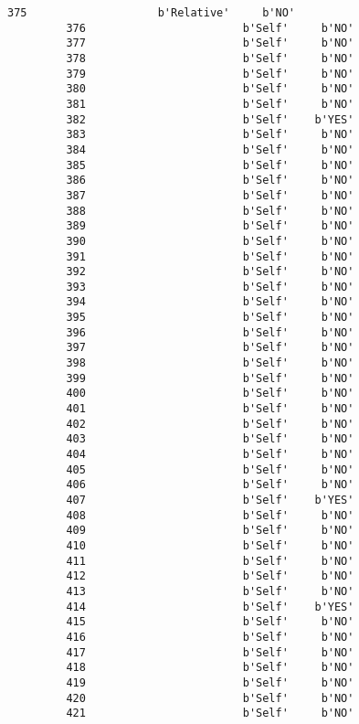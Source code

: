 \documentclass[11pt]{article}
\begin{document}
\begin{Verbatim}[commandchars=\\\{\}]
         375                    b'Relative'     b'NO'  
         376                        b'Self'     b'NO'  
         377                        b'Self'     b'NO'  
         378                        b'Self'     b'NO'  
         379                        b'Self'     b'NO'  
         380                        b'Self'     b'NO'  
         381                        b'Self'     b'NO'  
         382                        b'Self'    b'YES'  
         383                        b'Self'     b'NO'  
         384                        b'Self'     b'NO'  
         385                        b'Self'     b'NO'  
         386                        b'Self'     b'NO'  
         387                        b'Self'     b'NO'  
         388                        b'Self'     b'NO'  
         389                        b'Self'     b'NO'  
         390                        b'Self'     b'NO'  
         391                        b'Self'     b'NO'  
         392                        b'Self'     b'NO'  
         393                        b'Self'     b'NO'  
         394                        b'Self'     b'NO'  
         395                        b'Self'     b'NO'  
         396                        b'Self'     b'NO'  
         397                        b'Self'     b'NO'  
         398                        b'Self'     b'NO'  
         399                        b'Self'     b'NO'  
         400                        b'Self'     b'NO'  
         401                        b'Self'     b'NO'  
         402                        b'Self'     b'NO'  
         403                        b'Self'     b'NO'  
         404                        b'Self'     b'NO'  
         405                        b'Self'     b'NO'  
         406                        b'Self'     b'NO'  
         407                        b'Self'    b'YES'  
         408                        b'Self'     b'NO'  
         409                        b'Self'     b'NO'  
         410                        b'Self'     b'NO'  
         411                        b'Self'     b'NO'  
         412                        b'Self'     b'NO'  
         413                        b'Self'     b'NO'  
         414                        b'Self'    b'YES'  
         415                        b'Self'     b'NO'  
         416                        b'Self'     b'NO'  
         417                        b'Self'     b'NO'  
         418                        b'Self'     b'NO'  
         419                        b'Self'     b'NO'  
         420                        b'Self'     b'NO'  
         421                        b'Self'     b'NO'  

\end{Verbatim}
\end{document}
